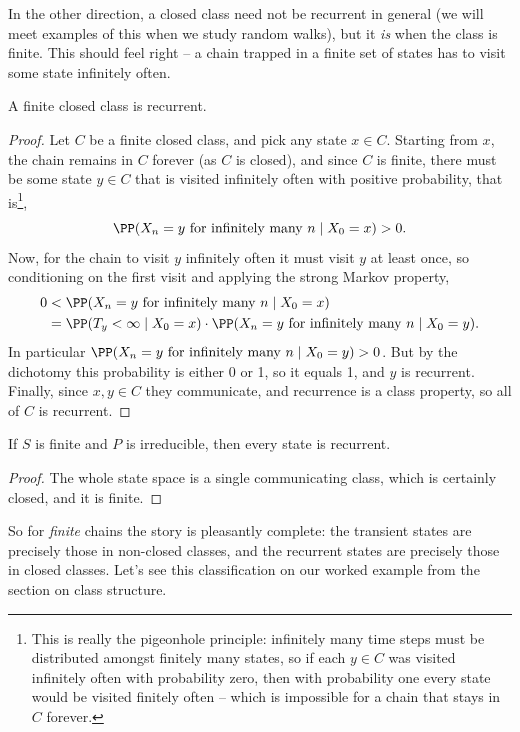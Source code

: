 \documentclass[a4paper]{scrartcl}
\begin{document}
In the other direction, a closed class need not be recurrent in general (we will meet examples of this when we study random walks), but it \emph{is} when the class is finite. This should feel right -- a chain trapped in a finite set of states has to visit some state infinitely often.

\begin{theorem}
	A finite closed class is recurrent.
\end{theorem}
\begin{proof}
	Let $C$ be a finite closed class, and pick any state $x \in C$. Starting from $x$, the chain remains in $C$ forever (as $C$ is closed), and since $C$ is finite, there must be some state $y \in C$ that is visited infinitely often with positive probability, that is\footnote{This is really the pigeonhole principle: infinitely many time steps must be distributed amongst finitely many states, so if each $y \in C$ was visited infinitely often with probability zero, then with probability one every state would be visited finitely often -- which is impossible for a chain that stays in $C$ forever.},
	$$
	\PP(X_n = y \text{ for infinitely many } n \mid X_0 = x) > 0.
	$$
	Now, for the chain to visit $y$ infinitely often it must visit $y$ at least once, so conditioning on the first visit and applying the strong Markov property,
	\begin{align*}
		0 &< \PP(X_n = y \text{ for infinitely many } n \mid X_0 = x) \\
		&= \PP(T_y < \infty \mid X_0 = x) \cdot \PP(X_n = y \text{ for infinitely many } n \mid X_0 = y).
	\end{align*}
	In particular $\PP(X_n = y \text{ for infinitely many } n \mid X_0 = y) > 0$. But by the dichotomy this probability is either 0 or 1, so it equals 1, and $y$ is recurrent. Finally, since $x, y \in C$ they communicate, and recurrence is a class property, so all of $C$ is recurrent.
\end{proof}

\begin{corollary}
	If $S$ is finite and $P$ is irreducible, then every state is recurrent.
\end{corollary}
\begin{proof}
	The whole state space is a single communicating class, which is certainly closed, and it is finite.
\end{proof}

So for \emph{finite} chains the story is pleasantly complete: the transient states are precisely those in non-closed classes, and the recurrent states are precisely those in closed classes. Let's see this classification on our worked example from the section on class structure.
\end{document}
